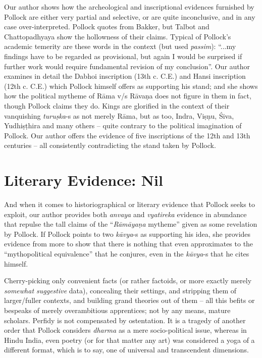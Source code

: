 Our author shows how the archeological and inscriptional evidences furnished by Pollock are either very partial and selective, or are quite inconclusive, and in any case over-interpreted. Pollock quotes from Bakker, but Talbot and Chattopadhyaya show the hollowness of their claims. Typical of Pollock’s academic temerity are these words in the context (but used {\sl passim}): “...my findings have to be regarded as provisional, but again I would be surprised if further work would require fundamental revision of my conclusion”. Our author examines in detail the Dabhoi inscription (13th c. C.E.) and Hansi inscription (12th c. C.E.) which Pollock himself offers as supporting his stand; and she shows how the political mytheme of Rāma v/s Rāvaṇa does not figure in them in fact, though Pollock claims they do. Kings are glorified in the context of their vanquishing {\sl turuṣka}-s as not merely Rāma, but as too, Indra, Viṣṇu, Śiva, Yudhiṣṭhira and many others -- quite contrary to the political imagination of Pollock. Our author offers the evidence of five inscriptions of the 12th and 13th centuries -- all consistently contradicting the stand taken by Pollock.\\[-12pt]

\section*{Literary Evidence: Nil}

And when it comes to historiographical or literary evidence that Pollock seeks to exploit, our author provides both {\sl anvaya} and {\sl vyatireka} evidence in abundance that repulse the tall claims of  the “{\sl Rāmāyaṇa} mytheme” given as some revelation by Pollock. If Pollock points to two {\sl kāvya}-s as supporting his idea, she provides evidence from more to show that there is nothing that even approximates to the “mythopolitical equivalence” that he conjures, even in the {\sl kāvya}-s that he cites himself.

Cherry-picking only convenient facts (or rather factoids, or more exactly merely {\sl somewhat suggestive} data), concealing their settings, and stripping them of larger/fuller contexts, and building grand theories out of them -- all this befits or bespeaks of merely overambitious apprentices; not by any means, mature scholars. Perfidy is not compensated by ostentation. It is a tragedy of another order that Pollock considers {\sl dharma} as a mere socio-political issue, whereas in Hindu India, even poetry (or for that matter any art) was considered a yoga of a different format, which is to say, one of universal and transcendent dimensions.\\[-20pt] 

